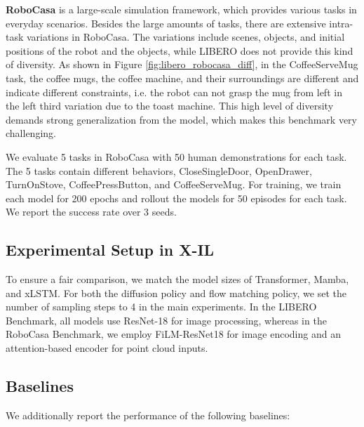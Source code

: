 \textbf{RoboCasa} \cite{nasiriany2024robocasalargescalesimulationeveryday} is a large-scale simulation framework, which provides various tasks in everyday scenarios. Besides the large amounts of tasks, there are extensive intra-task variations in RoboCasa. The variations include scenes, objects, and initial positions of the robot and the objects, while LIBERO does not provide this kind of diversity. As shown in Figure \ref{fig:libero_robocasa_diff}, in the CoffeeServeMug task, the coffee mugs, the coffee machine, and their surroundings are different and indicate different constraints, i.e. the robot can not grasp the mug from left in the left third variation due to the toast machine. This high level of diversity demands strong generalization from the model, which makes this benchmark very challenging.


We evaluate 5 tasks in RoboCasa with 50 human demonstrations for each task. The 5 tasks contain different behaviors, CloseSingleDoor, OpenDrawer, TurnOnStove, CoffeePressButton, and CoffeeServeMug. For training, we train each model for 200 epochs and rollout the models for 50 episodes for each task. We report the success rate over 3 seeds.
%     



\subsection{Experimental Setup in X-IL}
To ensure a fair comparison, we match the model sizes of Transformer, Mamba, and xLSTM. For both the diffusion policy and flow matching policy, we set the number of sampling steps to 4 in the main experiments. In the LIBERO Benchmark, all models use ResNet-18 for image processing, whereas in the RoboCasa Benchmark, we employ FiLM-ResNet18 for image encoding and an attention-based encoder for point cloud inputs.

\subsection{Baselines}
We additionally report the performance of the following baselines:


